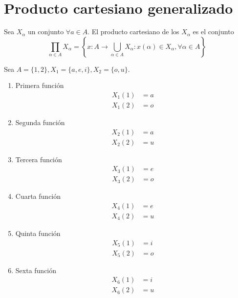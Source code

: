 \section{Producto cartesiano generalizado}

Sea $X_\alpha$ un conjunto $\forall a\in A$. El producto cartesiano de los $X_\alpha$ es el conjunto 
$$\prod_{\alpha \in A}X_{\alpha}=\left\{ x:A\to \bigcup_{\alpha \in A}X_\alpha: x(\alpha)\in X_\alpha, \forall \alpha\in A\right\}$$

\begin{ejemplo}
    Sea $A=\{1,2\},X_1=\{a,e,i\},X_2=\{o,u\}$.
    \begin{enumerate}
        \item Primera función
        \begin{align*}
            X_1(1) &= a\\
            X_1(2) &= o
        \end{align*}
        \item Segunda función
        \begin{align*}
            X_2(1) &= a\\
            X_2(2) &= u
        \end{align*}
        \item Tercera función
        \begin{align*}
            X_3(1) &= e\\
            X_3(2) &= o
        \end{align*}
        \item Cuarta función
        \begin{align*}
            X_4(1) &= e\\
            X_4(2) &= u
        \end{align*}
        \item Quinta función
        \begin{align*}
            X_5(1) &= i\\
            X_5(2) &= o
        \end{align*}
        \item Sexta función
        \begin{align*}
            X_6(1) &= i\\
            X_6(2) &= u
        \end{align*}
    \end{enumerate}
\end{ejemplo}